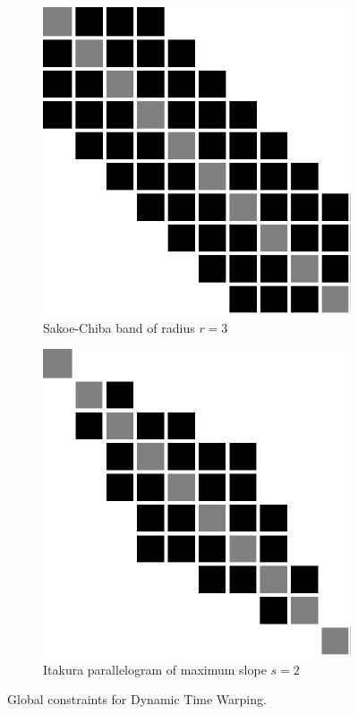 \begin{figure}[t]
    \begin{subfigure}[b]{0.4\textwidth}
         \centering
         \includegraphics[width=\textwidth]{fig/sakoe}
         \caption{Sakoe-Chiba band of radius $r=3$}
         \label{fig:sakoe}
     \end{subfigure}
     \hfill
     \begin{subfigure}[b]{0.4\textwidth}
          \centering
          \includegraphics[width=\textwidth]{fig/itakura}
          \caption{Itakura parallelogram of maximum slope $s=2$}
          \label{fig:itakura}
      \end{subfigure}
    \caption{Global constraints for Dynamic Time Warping.}
\end{figure} 




